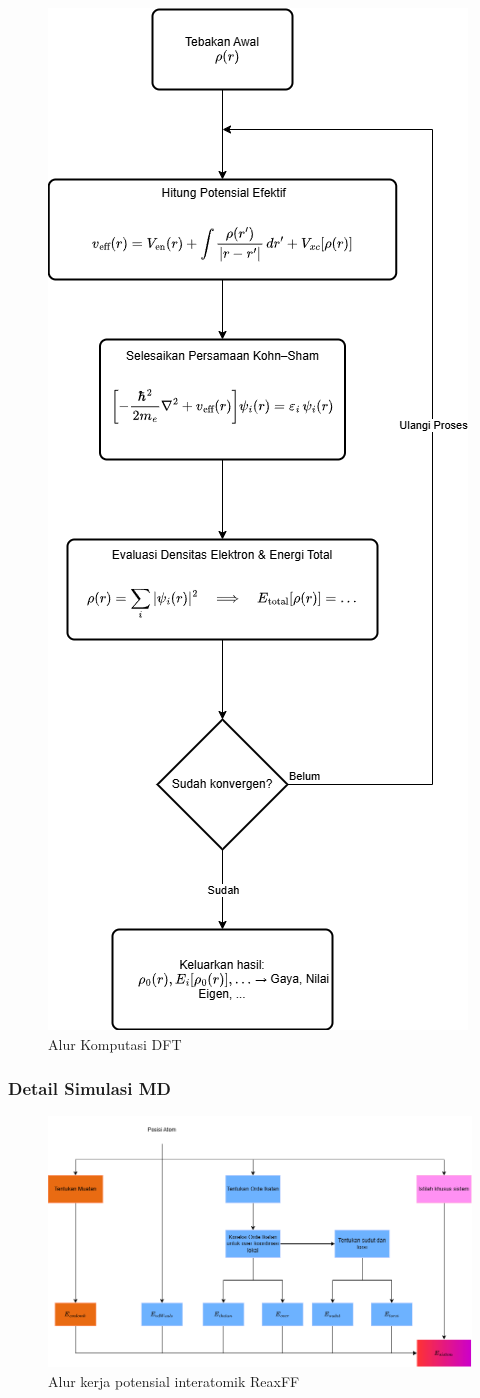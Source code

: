 \begin{figure}
    \centering
    \includegraphics[width=0.5\linewidth]{gambar/DFT.drawio.png}
    \caption{Alur Komputasi DFT }
    \label{Diagram Alir DFT}
\end{figure}



\subsubsection{Detail Simulasi MD}

\begin{figure}
    \centering
    \includegraphics[width=0.9\linewidth]{gambar/Diagram_reaxff}
    \caption{Alur kerja potensial interatomik ReaxFF }
    \label{Diagram Alir Reaxff}
\end{figure}

